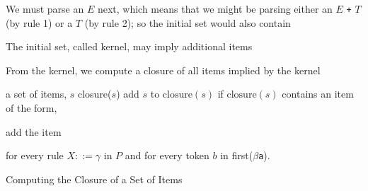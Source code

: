 \documentclass[8pt,a4paper,compress,handout]{beamer}
\newcommand{\mm}[1]{$#1$}
\newenvironment{spaced}
{
\smallskip
\hspace{.5cm}
\begin{minipage}[c]{\textwidth}
}
{
\end{minipage}
\smallskip
}
\begin{document}
\begin{frame}[fragile]
\pause

We must parse an $E$ next, which means that we might be parsing either an $E$ \lstinline{+} $T$ (by rule 1) or a $T$ (by rule 2); so the initial set would also contain

\text{ }
\begin{spaced}
\begin{production}
[\mm{E}  ::= \mm{\cdot} \mm{E} \lstinline{+} \mm{T}, \lstinline{#}]
[\mm{E}  ::= \mm{\cdot} \mm{T}, \lstinline{#}]
\end{production}
\end{spaced}

\pause

The initial set, called kernel, may imply additional items

\pause
\bigskip

From the kernel, we compute a closure of all items implied by the kernel

\pause
\bigskip

\begin{algorithm}[H]
\begin{algorithmic}
\REQUIRE a set of items, $s$
\ENSURE closure($s$)
\STATE add $s$ to $\text{closure}(s)$
\REPEAT
\STATE if $\text{closure}(s)$ contains an item of the form,

\begin{production}
[\mm{Y} ::= \mm{\alpha \cdot} \mm{X} \mm{\beta}, \lstinline{a}]
\end{production}

\noindent add the item

\begin{production}
[\mm{X} ::= \mm{\cdot \gamma}, \lstinline{b}]
\end{production}

\noindent for every rule $X ::= \gamma$ in $P$ and for every token $b$ in first($\beta$\lstinline{a}).
\end{algorithmic}
\caption{Computing the Closure of a Set of Items}
\end{algorithm}
\end{frame}
\end{document}
